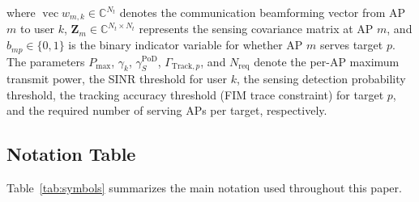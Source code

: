 \documentclass[12pt,a4paper]{article}
\DeclareMathOperator{\vect}{vec}
\newcommand{\mat}[1]{\mathbf{#1}}
\begin{document}
where $\vect{w}_{m,k} \in \mathbb{C}^{N_t}$ denotes the communication beamforming vector from AP $m$ to user $k$, $\mat{Z}_m \in \mathbb{C}^{N_t \times N_t}$ represents the sensing covariance matrix at AP $m$, and $b_{mp} \in \{0,1\}$ is the binary indicator variable for whether AP $m$ serves target $p$. The parameters $P_{\max}$, $\gamma_k$, $\gamma_S^{\text{PoD}}$, $\Gamma_{\text{Track},p}$, and $N_{\text{req}}$ denote the per-AP maximum transmit power, the SINR threshold for user $k$, the sensing detection probability threshold, the tracking accuracy threshold (FIM trace constraint) for target $p$, and the required number of serving APs per target, respectively.

\subsection{Notation Table}

Table~\ref{tab:symbols} summarizes the main notation used throughout this paper.
\end{document}
